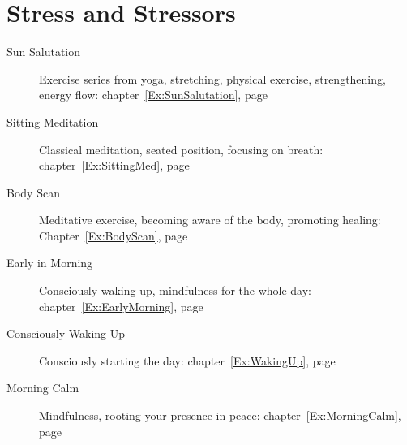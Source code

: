 \documentclass[../main.tex]{subfiles}
\begin{document}
%
\section{Stress and Stressors}

\begin{description}
\item[Sun Salutation] Exercise series from yoga, stretching, physical exercise, strengthening, energy flow:  chapter~\ref{Ex:SunSalutation}, page~\pageref{Ex:SunSalutation}
\item[Sitting Meditation] Classical meditation, seated position, focusing on breath: chapter~\ref{Ex:SittingMed}, page~\pageref{Ex:SittingMed}
\item[Body Scan] Meditative exercise, becoming aware of the body, promoting healing: Chapter~\ref{Ex:BodyScan}, page~\pageref{Ex:BodyScan}
  \item[Early in Morning] Consciously waking up, mindfulness for the whole day: chapter~\ref{Ex:EarlyMorning}, page~\pageref{Ex:EarlyMorning}
  \item[Consciously Waking Up] Consciously starting the day: chapter~\ref{Ex:WakingUp}, page~\pageref{Ex:WakingUp}
  \item[Morning Calm] Mindfulness, rooting your presence in peace: chapter~\ref{Ex:MorningCalm}, page~\pageref{Ex:MorningCalm}
  \end{description}
\end{document}
